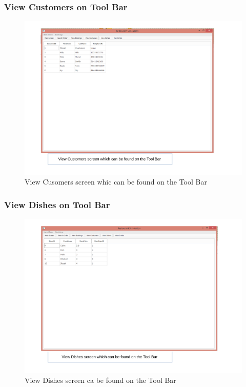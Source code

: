 \begin{landscape}
\subsubsection{View Customers on Tool Bar}
\begin{figure}[H]
    \includegraphics[width = 15cm]{./Maintenance/images/screen19}
    \caption{View Cusomers screen whic can be found on the Tool Bar} \label{fig:screen19}
\end{figure}

\subsubsection{View Dishes on Tool Bar}
\begin{figure}[H]
    \includegraphics[width = 15cm]{./Maintenance/images/screen20}
    \caption{View Dishes screen ca be found on the Tool Bar} \label{fig:screen20}
\end{figure}


\end{landscape}
